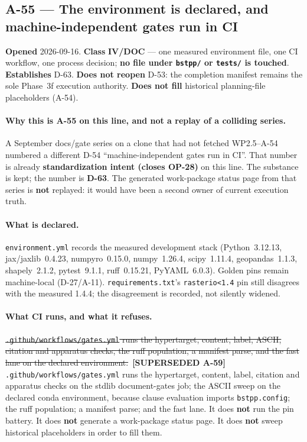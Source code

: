 \documentclass[
  10pt,
]{article}
\newcommand{\amdstrike}[1]{\sout{#1}}
\newcommand{\amdstrike}[1]{\textcolor{supcolor}{#1}}
\newcommand{\supsd}[2]{{\color{supcolor}\amdstrike{#2}}~{\color{amdcolor}\footnotesize\textbf{[SUPERSEDED #1]}}}
\begin{document}
\hypertarget{a-55}{%
\subsection{A-55 --- The environment is declared, and machine-independent gates
run in CI}\label{a-55}}

\textbf{Opened} 2026-09-16. \textbf{Class} \textbf{IV/DOC} --- one measured
environment file, one CI workflow, one process decision; \textbf{no file under
\texttt{bstpp/} or \texttt{tests/} is touched}. \textbf{Establishes} D-63.
\textbf{Does not reopen} D-53: the completion manifest remains the sole
Phase~3f execution authority. \textbf{Does not fill} historical planning-file
placeholders (A-54).

\paragraph{Why this is A-55 on this line, and not a replay of a colliding series.}
A September docs/gate series on a clone that had not fetched WP2.5--A-54
numbered a different D-54 ``machine-independent gates run in CI''. That number
is already \textbf{standardization intent (closes OP-28)} on this line. The
substance is kept; the number is \textbf{D-63}. The generated work-package
status page from that series is \textbf{not} replayed: it would have been a
second owner of current execution truth.

\paragraph{What is declared.}
\texttt{environment.yml} records the measured development stack
(Python~3.12.13, jax/jaxlib~0.4.23, numpyro~0.15.0, numpy~1.26.4,
scipy~1.11.4, geopandas~1.1.3, shapely~2.1.2, pytest~9.1.1, ruff~0.15.21,
PyYAML~6.0.3). Golden pins remain machine-local (D-27/A-11).
\texttt{requirements.txt}'s \texttt{rasterio<1.4} pin still disagrees with the
measured 1.4.4; the disagreement is recorded, not silently widened.

\paragraph{What CI runs, and what it refuses.}
\supsd{A-59}{\texttt{.github/workflows/gates.yml} runs the hypertarget, content, label,
ASCII, citation and apparatus checks, the ruff population, a manifest parse,
and the fast lane on the declared environment.}
\texttt{.github/workflows/gates.yml} runs the hypertarget, content, label,
citation and apparatus checks on the stdlib document-gates job; the ASCII
sweep on the declared conda environment, because clause evaluation imports
\texttt{bstpp.config}; the ruff population; a manifest parse; and the fast
lane. It does \textbf{not} run the pin
battery. It does \textbf{not} generate a work-package status page. It does
\textbf{not} sweep historical placeholders in order to fill them.
\end{document}
